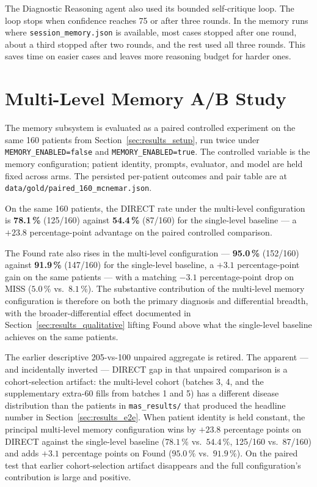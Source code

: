 The Diagnostic Reasoning agent also used its bounded self-critique loop. The
loop stops when confidence reaches 75 or after three rounds. In the memory runs
where \texttt{session\_memory.json} is available, most cases stopped after one
round, about a third stopped after two rounds, and the rest used all three
rounds. This saves time on easier cases and leaves more reasoning budget for
harder ones.

\section{Multi-Level Memory A/B Study}
\label{sec:results_memory_ab}

The memory subsystem is evaluated as a paired controlled experiment
on the same 160 patients from Section~\ref{sec:results_setup}, run
twice under \texttt{MEMORY\_ENABLED=false} and
\texttt{MEMORY\_ENABLED=true}. The controlled variable is the memory
configuration; patient identity, prompts, evaluator, and model are
held fixed across arms. The persisted per-patient outcomes and pair
table are at \texttt{data/gold/paired\_160\_mcnemar.json}.

On the same 160 patients, the DIRECT rate under the multi-level
configuration is \textbf{78.1\,\%} (125/160) against
\textbf{54.4\,\%} (87/160) for the single-level baseline ---
a $+23.8$ percentage-point advantage on the paired controlled
comparison.

The Found rate also rises in the multi-level configuration ---
\textbf{95.0\,\%} (152/160) against \textbf{91.9\,\%} (147/160) for
the single-level baseline, a $+3.1$ percentage-point gain on the
same patients --- with a matching $-3.1$ percentage-point drop on
MISS ($5.0\,\%$ vs.\ $8.1\,\%$). The substantive contribution of the
multi-level memory configuration is therefore on both the primary
diagnosis and differential breadth, with the broader-differential
effect documented in Section~\ref{sec:results_qualitative} lifting
Found above what the single-level baseline achieves on the same
patients.

The earlier descriptive 205-vs-100 unpaired aggregate is retired.
The apparent --- and incidentally inverted --- DIRECT gap in that
unpaired comparison is a cohort-selection artifact: the multi-level cohort
(batches 3, 4, and the supplementary extra-60 fills from batches 1
and 5) has a different disease distribution than the patients in
\texttt{mas\_results/} that produced the headline number in
Section~\ref{sec:results_e2e}. When patient identity is held
constant, the principal multi-level memory configuration wins by
$+23.8$ percentage points on DIRECT against the single-level
baseline ($78.1\,\%$ vs.\ $54.4\,\%$, 125/160 vs.\ 87/160) and adds
$+3.1$ percentage points on Found ($95.0\,\%$ vs.\ $91.9\,\%$). On
the paired test that earlier cohort-selection artifact disappears
and the full configuration's contribution is large and positive.

